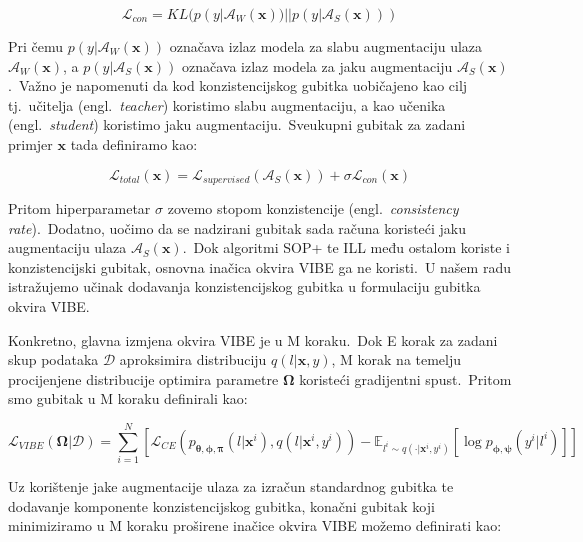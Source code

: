 \documentclass[diplomskirad]{fer}
\begin{document}
\begin{equation}
  \mathcal{L}_{con} = KL(p(y | \mathcal{A}_{W}(\bm{x})) || p(y | \mathcal{A}_{S}(\bm{x})))
  \label{eq:con_loss}
\end{equation}

Pri čemu $p(y | \mathcal{A}_{W}(\bm{x}))$ označava izlaz modela za slabu augmentaciju ulaza $\mathcal{A}_{W}(\bm{x})$, a $p(y | \mathcal{A}_{S}(\bm{x}))$ označava izlaz modela za jaku augmentaciju $\mathcal{A}_{S}(\bm{x})$.\ 
Važno je napomenuti da kod konzistencijskog gubitka uobičajeno kao cilj tj.\ učitelja (engl.\ \textit{teacher}) koristimo slabu augmentaciju, a kao učenika (engl.\ \textit{student}) koristimo jaku augmentaciju.\ 
Sveukupni gubitak za zadani primjer $\bm{x}$ tada definiramo kao:

\begin{equation}
  \mathcal{L}_{total}(\bm{x}) = \mathcal{L}_{supervised}(\mathcal{A}_{S}(\bm{x})) + \sigma \mathcal{L}_{con}(\bm{x})
  \label{eq:loss_with_con_loss}
\end{equation}

Pritom hiperparametar $\sigma$ zovemo stopom konzistencije (engl.\ \textit{consistency rate}).\ Dodatno, uočimo da se nadzirani gubitak sada računa koristeći jaku augmentaciju ulaza $\mathcal{A}_{S}(\bm{x})$.\ 
Dok algoritmi SOP+ te ILL među ostalom koriste i konzistencijski gubitak, osnovna inačica okvira VIBE ga ne koristi.\ 
U našem radu istražujemo učinak dodavanja konzistencijskog gubitka u formulaciju gubitka okvira VIBE.\

Konkretno, glavna izmjena okvira VIBE je u M koraku.\ Dok E korak za zadani skup podataka $\mathcal{D}$ aproksimira distribuciju $q(l | \bm{x}, y)$, M korak na temelju procijenjene distribucije optimira parametre $\bm{\Omega}$ koristeći gradijentni spust.\ 
Pritom smo gubitak u M koraku definirali kao:

\begin{equation}
  \mathcal{L}_{VIBE}(\bm{\Omega} | \mathcal{D}) = \sum_{i=1}^{N} \left[ \mathcal{L}_{CE} (p_{\bm{\theta}, \bm{\phi}, \bm{\pi}}(l | \bm{x}^i), q(l | \bm{x}^i, y^i)) - \mathbb{E}_{l^i \sim q(\cdot | \bm{x}^i, y^i)} \left[ \log p_{\bm{\phi}, \bm{\psi}}(y^i | l^i) \right] \right]
  \label{eq:vibe_m_step_loss}
\end{equation}

\pagebreak

Uz korištenje jake augmentacije ulaza za izračun standardnog gubitka te dodavanje komponente konzistencijskog gubitka, konačni gubitak koji minimiziramo u M koraku proširene inačice okvira VIBE možemo definirati kao:
\end{document}
